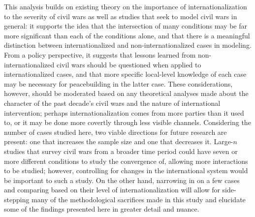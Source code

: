 \documentclass{article}
\begin{document}
This analysis builds on existing theory on the importance of internationalization to the severity of civil wars as well as studies that seek to model civil wars in general: it supports the idea that the intersection of many conditions may be far more significant than each of the conditions alone, and that there is a meaningful distinction between internationalized and non-internationalized cases in modeling. From a policy perspective, it suggests that lessons learned from non-internationalized civil wars should be questioned when applied to internationalized cases, and that more specific local-level knowledge of each case may be necessary for peacebuilding in the latter case. These considerations, however, should be moderated based on any theoretical analyses made about the character of the past decade's civil wars and the nature of international intervention; perhaps internationalization comes from more parties than it used to, or it may be done more covertly through less visible channels. Considering the number of cases studied here, two viable directions for future research are present: one that increases the sample size and one that decreases it. Large-$n$ studies that survey civil wars from a broader time period could have seven or more different conditions to study the convergence of, allowing more interactions to be studied; however, controlling for changes in the international system would be important to such a study. On the other hand, narrowing in on a few cases and comparing based on their level of internationalization will allow for side-stepping many of the methodological sacrifices made in this study and elucidate some of the findings presented here in greater detail and nuance. 
\end{document}
